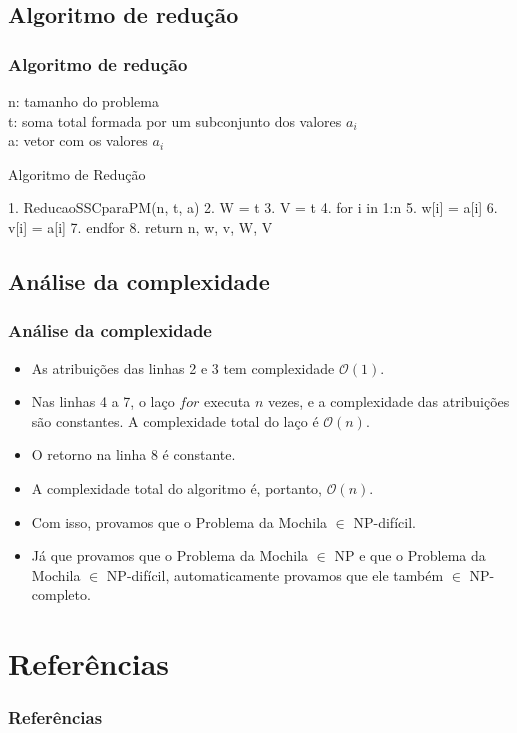 \documentclass{beamer}
\begin{document}
\subsection{Algoritmo de redução}
\begin{frame}[fragile]
\frametitle{Algoritmo de redução}
    n: tamanho do problema \\
    t: soma total formada por um subconjunto dos valores $a_{i}$ \\
    a: vetor com os valores $a_{i}$ \\
    \begin{block}{Algoritmo de Redução}
        \begin{semiverbatim}
        1. ReducaoSSCparaPM(n, t, a)
        2.    W = t
        3.    V = t
        4.    for i in 1:n
        5.        w[i] = a[i]
        6.        v[i] = a[i]
        7.    endfor
        8.    return n, w, v, W, V
        \end{semiverbatim}
    \end{block}
\end{frame}

\subsection{Análise da complexidade}
\begin{frame}
\frametitle{Análise da complexidade}
    \begin{itemize}
        \item As atribuições das linhas 2 e 3 tem complexidade $\mathcal{O}(1)$.

        \item Nas linhas 4 a 7, o laço $for$ executa $n$ vezes, e a complexidade das atribuições são constantes.
            A complexidade total do laço é $\mathcal{O}(n)$.
        \item O retorno na linha 8 é constante.
        \item A complexidade total do algoritmo é, portanto, $\mathcal{O}(n)$.
        \item Com isso, provamos que o Problema da Mochila $\in$ NP-difícil.
        
        \item Já que provamos que o Problema da Mochila $\in$ NP e que o Problema da Mochila $\in$ NP-difícil, automaticamente provamos que ele também $\in$ NP-completo.
    \end{itemize}
\end{frame}

\section{Referências}
\begin{frame}
\frametitle{Referências}
\end{frame}
\end{document}
